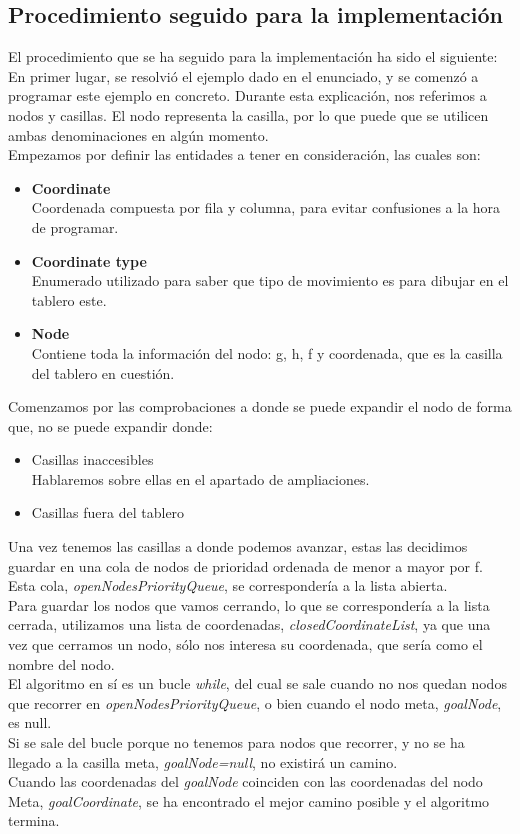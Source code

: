 \documentclass[12pt]{article}
\begin{document}
\subsection{Procedimiento seguido para la implementación}
El procedimiento que se ha seguido para la implementación ha sido el siguiente:\\
En primer lugar, se resolvió el ejemplo dado en el enunciado, y se comenzó a programar este ejemplo en concreto. Durante esta explicación, nos referimos a nodos y casillas. El nodo representa la casilla, por lo que puede que se utilicen ambas denominaciones en algún momento.\\
Empezamos por definir las entidades a tener en consideración, las cuales son:
\begin{itemize}
    \item \textbf{Coordinate}\\
    Coordenada compuesta por fila y columna, para evitar confusiones a la hora de programar.
    \item \textbf{Coordinate type}\\
    Enumerado utilizado para saber que tipo de movimiento es para dibujar en el tablero este.
    \item \textbf{Node}\\
    Contiene toda la información del nodo: g, h, f y coordenada, que es la casilla del tablero en cuestión.
\end{itemize}
Comenzamos por las comprobaciones a donde se puede expandir el nodo de forma que, no se puede expandir donde:
\begin{itemize}
    \item Casillas inaccesibles\\
    Hablaremos sobre ellas en el apartado de ampliaciones.
    \item Casillas fuera del tablero
\end{itemize}
Una vez tenemos las casillas a donde podemos avanzar, estas las decidimos guardar en una cola de nodos de prioridad ordenada de menor a mayor por f. Esta cola, \textit{openNodesPriorityQueue}, se correspondería a la lista abierta.\\ Para guardar los nodos que vamos cerrando, lo que se correspondería a la lista cerrada, utilizamos una lista de coordenadas, \textit{closedCoordinateList}, ya que una vez que cerramos un nodo, sólo nos interesa su coordenada, que sería como el nombre del nodo.\\
El algoritmo en sí es un bucle\textit{ while}, del cual se sale cuando no nos quedan nodos que recorrer en \textit{openNodesPriorityQueue}, o bien cuando el nodo meta, \textit{goalNode}, es null.\\
Si se sale del bucle porque no tenemos para nodos que recorrer, y no se ha llegado a la casilla meta, \textit{goalNode=null}, no existirá un camino.\\
Cuando las coordenadas del \textit{goalNode} coinciden con las coordenadas del nodo Meta, \textit{goalCoordinate}, se ha encontrado el mejor camino posible y el algoritmo termina. 
\end{document}
